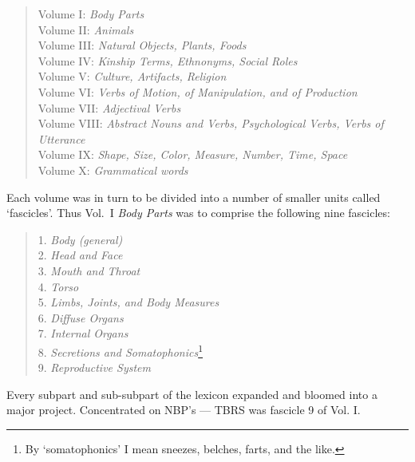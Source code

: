 \begin{quote}
{\footnotesize
Volume I: \textit{Body Parts}\nopagebreak[4]\\
Volume II: \textit{Animals}\\
Volume III: \textit{Natural Objects, Plants, Foods }\\
Volume IV: \textit{Kinship Terms, Ethnonyms, Social Roles}\\
Volume V: \textit{Culture, Artifacts, Religion}\\
Volume VI: \textit{Verbs of Motion, of Manipulation, and of Production}\\
Volume VII: \textit{Adjectival Verbs}\\
Volume VIII: \textit{Abstract Nouns and Verbs, Psychological Verbs, Verbs of Utterance }\\
Volume IX: \textit{Shape, Size, Color, Measure, Number, Time, Space}\\
Volume X: \textit{Grammatical words}\\
}
\end{quote}

Each volume was in turn to be divided into a number of smaller units called
‘fascicles’. Thus Vol.~I \textit{Body Parts} was to comprise the following nine
fascicles:

\begin{quote}
{\footnotesize
1. \textit{Body (general)}\\
2. \textit{Head and Face}\\
3. \textit{Mouth and Throat}\\
4. \textit{Torso}\\
5. \textit{Limbs, Joints, and Body Measures}\\
6. \textit{Diffuse Organs}\\
7. \textit{Internal Organs}\\
8. \textit{Secretions and Somatophonics}\footnote{By ‘somatophonics’ I mean sneezes,
belches, farts, and the like.}\\
9. \textit{Reproductive System}\\
}
\end{quote}

Every subpart and sub-subpart of the lexicon expanded and bloomed into a major project. Concentrated on NBP’s --- TBRS was fascicle 9 of Vol. I.


